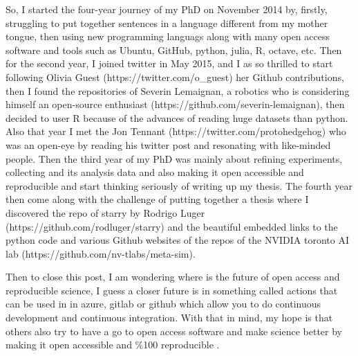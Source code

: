 \documentclass[11pt]{article}
\begin{document}
So, I started the four-year journey of my PhD on November 2014 
by, firstly, struggling to put together sentences in a language
different from my mother tongue, then using new programming 
languags along with many open access software and tools such as 
Ubuntu, GitHub, python, julia, R, octave, etc. 
Then for the second year, I joined twitter in May 2015, and 
I as so thrilled to start following Olivia Guest 
(https://twitter.com/o\_guest) her Github contributions, 
then I found the repositories of 
Severin Lemaignan, a robotics who is considering himself
an open-source enthusiast (https://github.com/severin-lemaignan),
then decided to user R because of the advances of reading huge datasets
than python. Also that year I met the Jon Tennant 
(https://twitter.com/protohedgehog) who was an open-eye by reading 
his twitter post and resonating with like-minded people.
Then the third year of my PhD was mainly about refining experiments, 
collecting and its analysis data and also making it open accessible 
and reproducible and start thinking seriously of writing up
my thesis. 
The fourth year then come along with the challenge of 
putting together a thesis where I discovered the repo of 
starry by Rodrigo Luger (https://github.com/rodluger/starry)
and the beautiful embedded links to the python code
and various Github websites 
of the repos of the NVIDIA toronto AI lab
(https://github.com/nv-tlabs/meta-sim).


Then to close this post, I am wondering where is the future of 
open access and reproducible science, I guess a closer 
future is in something called actions that can be used in
in azure, gitlab or github which allow you to do 
continuous development and continuous integration.
With that in mind, my hope is that others also try to have a go to
open access software and make science better by making it
open accessible and \%100 reproducible 
\citep{xochicale2019-github}.








\end{document}
